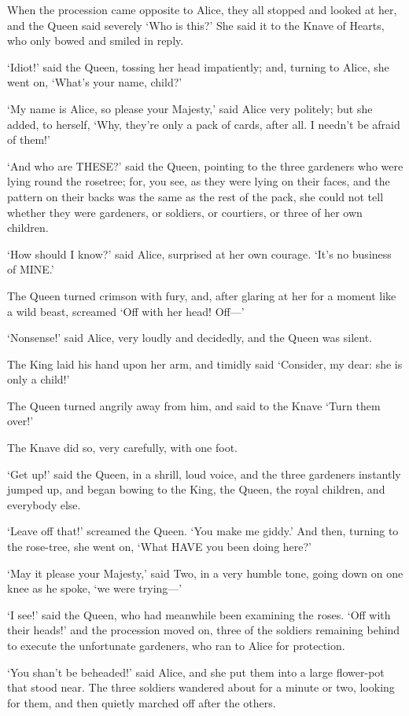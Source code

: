 \documentclass[12pt]{book}
\begin{document}
\begin{Parallel}[p]{}{}
{When the procession came opposite to Alice, they all stopped and looked at her, and the Queen said severely ‘Who is this?’ She said it to the Knave of Hearts, who only bowed and smiled in reply.

‘Idiot!’ said the Queen, tossing her head impatiently; and, turning to Alice, she went on, ‘What’s your name, child?’

‘My name is Alice, so please your Majesty,’ said Alice very politely; but she added, to herself, ‘Why, they’re only a pack of cards, after all. I needn’t be afraid of them!’

‘And who are THESE?’ said the Queen, pointing to the three gardeners who were lying round the rosetree; for, you see, as they were lying on their faces, and the pattern on their backs was the same as the rest of the pack, she could not tell whether they were gardeners, or soldiers, or courtiers, or three of her own children.

‘How should I know?’ said Alice, surprised at her own courage. ‘It’s no business of MINE.’

The Queen turned crimson with fury, and, after glaring at her for a moment like a wild beast, screamed ‘Off with her head! Off—’

‘Nonsense!’ said Alice, very loudly and decidedly, and the Queen was silent.

The King laid his hand upon her arm, and timidly said ‘Consider, my dear: she is only a child!’

The Queen turned angrily away from him, and said to the Knave ‘Turn them over!’

The Knave did so, very carefully, with one foot.

‘Get up!’ said the Queen, in a shrill, loud voice, and the three gardeners instantly jumped up, and began bowing to the King, the Queen, the royal children, and everybody else.

‘Leave off that!’ screamed the Queen. ‘You make me giddy.’ And then, turning to the rose-tree, she went on, ‘What HAVE you been doing here?’

‘May it please your Majesty,’ said Two, in a very humble tone, going down on one knee as he spoke, ‘we were trying—’

‘I see!’ said the Queen, who had meanwhile been examining the roses. ‘Off with their heads!’ and the procession moved on, three of the soldiers remaining behind to execute the unfortunate gardeners, who ran to Alice for protection.

‘You shan’t be beheaded!’ said Alice, and she put them into a large flower-pot that stood near. The three soldiers wandered about for a minute or two, looking for them, and then quietly marched off after the others.

}
\end{Parallel}
\end{document}
